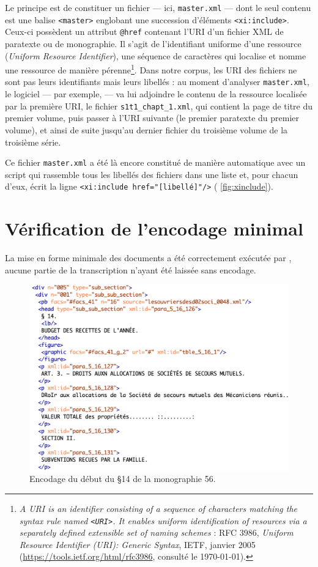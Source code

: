 Le principe est de constituer un fichier --- ici, \texttt{master.xml} --- dont le seul contenu est une balise \texttt{<master>} englobant une succession d'éléments \texttt{<xi:include>}. Ceux-ci possèdent un attribut \texttt{@href} contenant l'URI d'un fichier XML de paratexte ou de monographie. Il s'agit de l'identifiant uniforme d'une ressource (\textit{Uniform Resource Identifier}), \cad{} une séquence de caractères qui localise et nomme une ressource de manière pérenne\footnote{\og \textit{A URI is an identifier consisting of a sequence of characters matching the syntax rule named \texttt{<URI>}. It enables uniform identification of resources via a separately defined extensible set of naming schemes} \fg{} : RFC 3986, \textit{Uniform Resource Identifier (URI): Generic Syntax}, IETF, janvier 2005 (\url{https://tools.ietf.org/html/rfc3986}, consulté le \today).}. Dans notre corpus, les URI des fichiers ne sont pas leurs identifiants mais leurs libellés : au moment d'analyser \texttt{master.xml}, le logiciel --- par exemple, \oxygen{} --- va lui adjoindre le contenu de la ressource localisée par la première URI, \cad{} le fichier \texttt{s1t1\_chapt\_1.xml}, qui contient la page de titre du premier volume, puis passer à l'URI suivante (le premier paratexte du premier volume), et ainsi de suite jusqu'au dernier fichier du troisième volume de la troisième série.

Ce fichier \texttt{master.xml} a été là encore constitué de manière automatique avec un script qui rassemble tous les libellés des fichiers dans une liste et, pour chacun d'eux, écrit la ligne \texttt{<xi:include href="[libellé]"/>} (\fig{} \ref{fig:xinclude}).

\section{Vérification de l'encodage minimal}

La mise en forme minimale des documents a été correctement exécutée par \lse, aucune partie de la transcription n'ayant été laissée sans encodage.

\begin{figure}[h]
    \centering
    \includegraphics[width=15cm]{img/table_s2t2_chapt_5.png}
    \caption{Encodage du début du §14 de la monographie 56.}
    \label{fig:tableodm56xml}
\end{figure}

